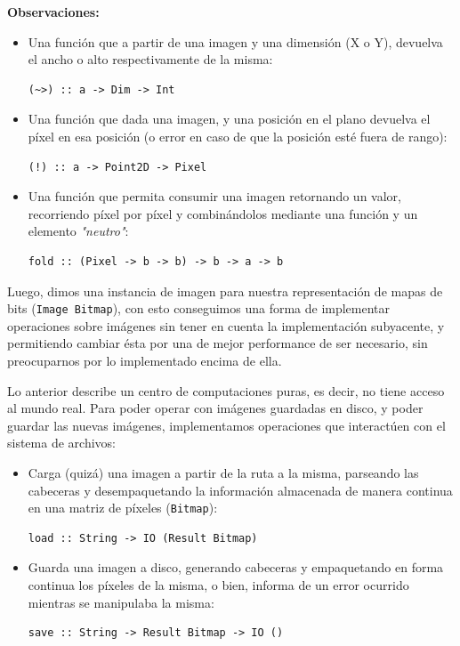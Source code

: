 \documentclass[a4paper, 11pt]{article} %
\begin{document}
	\textbf{Observaciones:}
	\begin{itemize}
		\item Una función que a partir de una imagen y una dimensión (X o Y), devuelva el ancho o alto respectivamente de la misma:
		\begin{lstlisting}
(~>) :: a -> Dim -> Int
		\end{lstlisting}

		\item Una función que dada una imagen, y una posición en el plano devuelva el píxel en esa posición (o error en caso de que la posición esté fuera de rango):
		\begin{lstlisting}
(!) :: a -> Point2D -> Pixel
		\end{lstlisting}
			  
		\item Una función que permita consumir una imagen retornando un valor, recorriendo píxel por píxel y combinándolos mediante una función y un elemento \textit{"neutro"}:
		\begin{lstlisting}
fold :: (Pixel -> b -> b) -> b -> a -> b
		\end{lstlisting}
	\end{itemize}
	
\noindent Luego, dimos una instancia de imagen para nuestra representación de mapas de bits (\texttt{Image Bitmap}), con esto conseguimos una forma de implementar operaciones sobre imágenes sin tener en cuenta la implementación subyacente, y permitiendo cambiar ésta por una de mejor performance de ser necesario, sin preocuparnos por lo implementado encima de ella.

\pagebreak

\noindent Lo anterior describe un centro de computaciones puras, es decir, no tiene acceso al mundo real. Para poder operar con imágenes guardadas en disco, y poder guardar las nuevas imágenes, implementamos operaciones que interactúen con el sistema de archivos:
	\begin{itemize}
		\item Carga (quizá) una imagen a partir de la ruta a la misma, parseando las cabeceras y desempaquetando la información almacenada de manera continua en una matriz de píxeles (\texttt{Bitmap}):  
		\begin{lstlisting}
load :: String -> IO (Result Bitmap)
		\end{lstlisting}

		\item Guarda una imagen a disco, generando cabeceras y empaquetando en forma continua los píxeles de la misma, o bien, informa de un error ocurrido mientras se manipulaba la misma:
		\begin{lstlisting}
save :: String -> Result Bitmap -> IO ()
		\end{lstlisting}
	\end{itemize}
\end{document}

